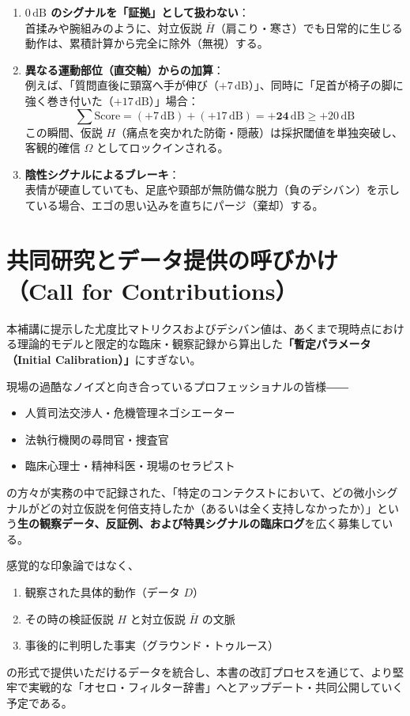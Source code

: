 \begin{enumerate}[label=\textbf{(\arabic*)}]
  \item \textbf{$0\,\mathrm{dB}$ のシグナルを「証拠」として扱わない}：\\
  首揉みや腕組みのように、対立仮説 $\bar{H}$（肩こり・寒さ）でも日常的に生じる動作は、累積計算から完全に除外（無視）する。
  \item \textbf{異なる運動部位（直交軸）からの加算}：\\
  例えば、「質問直後に頸窩へ手が伸び（$+7\,\mathrm{dB}$）」、同時に「足首が椅子の脚に強く巻き付いた（$+17\,\mathrm{dB}$）」場合：
  \begin{equation}
    \sum \text{Score} = (+7\,\mathrm{dB}) + (+17\,\mathrm{dB}) = \mathbf{+24\,\mathrm{dB}} \ge +20\,\mathrm{dB}
  \end{equation}
  この瞬間、仮説 $H$（痛点を突かれた防衛・隠蔽）は採択閾値を単独突破し、客観的確信 $\Omega$ としてロックインされる。
  \item \textbf{陰性シグナルによるブレーキ}：\\
  表情が硬直していても、足底や頸部が無防備な脱力（負のデシバン）を示している場合、エゴの思い込みを直ちにパージ（棄却）する。
\end{enumerate}

\section*{共同研究とデータ提供の呼びかけ（Call for Contributions）}

本補講に提示した尤度比マトリクスおよびデシバン値は、あくまで現時点における理論的モデルと限定的な臨床・観察記録から算出した\textbf{「暫定パラメータ（Initial Calibration）」}にすぎない。

現場の過酷なノイズと向き合っているプロフェッショナルの皆様――
\begin{itemize}
  \item 人質司法交渉人・危機管理ネゴシエーター
  \item 法執行機関の尋問官・捜査官
  \item 臨床心理士・精神科医・現場のセラピスト
\end{itemize}
の方々が実務の中で記録された、「特定のコンテクストにおいて、どの微小シグナルがどの対立仮説を何倍支持したか（あるいは全く支持しなかったか）」という\textbf{生の観察データ、反証例、および特異シグナルの臨床ログ}を広く募集している。

感覚的な印象論ではなく、
\begin{enumerate}[label=\textbf{(\arabic*)}]
  \item 観察された具体的動作（データ $D$）
  \item その時の検証仮説 $H$ と対立仮説 $\bar{H}$ の文脈
  \item 事後的に判明した事実（グラウンド・トゥルース）
\end{enumerate}
の形式で提供いただけるデータを統合し、本書の改訂プロセスを通じて、より堅牢で実戦的な「オセロ・フィルター辞書」へとアップデート・共同公開していく予定である。

